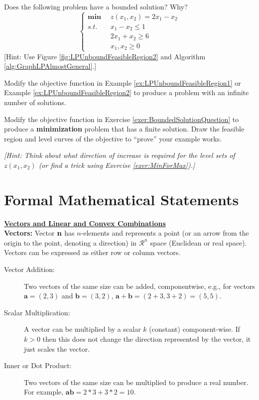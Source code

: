 \begin{exercise}{}{} Does the following problem have a bounded solution? Why?
\begin{equation}
\left\{
\begin{aligned}
\boldsymbol{\min}\;\;& z(x_1,x_2) = 2x_1 - x_2\\
s.t.\;\;& x_1 - x_2 \leq 1\\
& 2x_1 + x_2 \geq 6\\
&x_1,x_2 \geq 0
\end{aligned}
\right.
\end{equation}
[Hint: Use Figure \ref{fig:LPUnboundFeasibleRegion2} and Algorithm \ref{alg:GraphLPAlmostGeneral}.]
\label{exer:BoundedSolutionQuestion}
\end{exercise}

\begin{exercise}{}{} Modify the objective function in Example \ref{ex:LPUnboundFeasibleRegion1} or Example \ref{ex:LPUnboundFeasibleRegion2} to produce a problem with an infinite number of solutions. 
\end{exercise}

\begin{exercise}{}{} Modify the objective function in Exercise \ref{exer:BoundedSolutionQuestion} to produce a \textbf{minimization} problem that has a finite solution. Draw the feasible region and level curves of the objective to ``prove'' your example works. 

\emph{[Hint: Think about what direction of increase is required for the level sets of $z(x_1,x_2)$ (or find a trick using Exercise \ref{exer:MinForMax}).]}
\end{exercise}

\section{Formal Mathematical Statements}

\underline{\bf Vectors and Linear and Convex Combinations} \\

{\bf Vectors:} Vector $\bf n$ has ${n}$-elements and represents a point (or an arrow from the origin to the point, denoting a direction) in $\mathcal{R}^n$ space (Euclidean or real space). Vectors can be expressed as either row or column vectors. \vspace{-2mm}
\begin{description}
\item[Vector Addition:] Two vectors of the same size can be added, componentwise, e.g., for vectors
$\mathbf{a}=(2,3)$ and $\mathbf{b} = (3,2)$,  $\mathbf{a} + \mathbf{b} = (2+3,3+2) = (5,5)$. \vspace{-2mm}
\item[Scalar Multiplication:] A vector can be multiplied by a scalar $k$ (constant) component-wise. If $k > 0$ then this does not change the direction represented by the vector, it just scales the vector. \vspace{-2mm}
\item[Inner or Dot Product:] Two vectors of the same size can be multiplied to produce a real number.  For example, $\mathbf{a}\mathbf{b} = 2*3 + 3*2 = 10$.
\end{description} 

